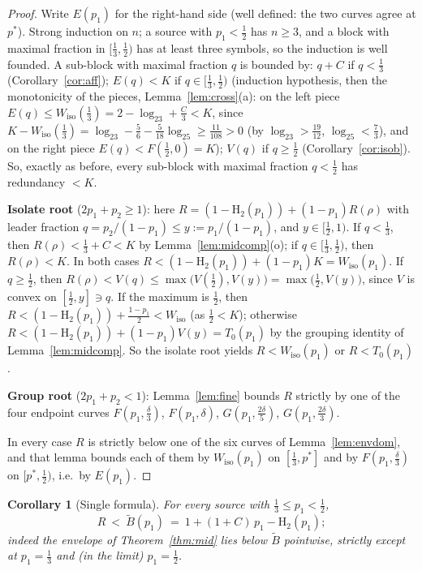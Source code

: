 \documentclass[journal]{IEEEtran}
\newtheorem{corollary}{Corollary}
\theoremstyle{definition}
\newcommand{\Hh}{\mathrm H_2}
\newcommand{\lgg}{\log_2}
\newcommand{\CC}{C}
\begin{document}
\begin{proof}
Write $E(p_1)$ for the right-hand side (well defined: the two curves agree at
$p^*$). Strong induction on $n$; a source with $p_1<\tfrac12$ has $n\ge3$,
and a block with maximal fraction in $[\tfrac13,\tfrac12)$ has at least three
symbols, so the induction is well founded. A sub-block with maximal fraction
$q$ is bounded by: $q+\CC$ if $q<\tfrac13$ (Corollary~\ref{cor:aff});
$E(q)<K$ if $q\in[\tfrac13,\tfrac12)$ (induction hypothesis, then the
monotonicity of the pieces, Lemma~\ref{lem:cross}(a): on the left piece
$E(q)\le W_{\mathrm{iso}}(\tfrac13)=2-\lgg3+\tfrac{\CC}3<K$, since
$K-W_{\mathrm{iso}}(\tfrac13)=\lgg3-\tfrac56-\tfrac5{18}\lgg5\ge\tfrac{11}{108}>0$
\textup{(}by $\lgg3>\tfrac{19}{12}$, $\lgg5<\tfrac73$\textup{)}, and on the right piece
$E(q)<F(\tfrac12,0)=K$); $V(q)$ if $q\ge\tfrac12$
(Corollary~\ref{cor:isob}). So, exactly as before, every sub-block with
maximal fraction $q<\tfrac12$ has redundancy $<K$.

\textbf{Isolate root} ($2p_1+p_2\ge1$): here $R=(1-\Hh(p_1))+(1-p_1)R(\rho)$
with leader fraction $q=p_2/(1-p_1)\le y:=p_1/(1-p_1)$, and
$y\in[\tfrac12,1)$. If $q<\tfrac13$, then $R(\rho)<\tfrac13+\CC<K$ by
Lemma~\ref{lem:midcomp}(o); if $q\in[\tfrac13,\tfrac12)$, then $R(\rho)<K$.
In both cases $R<(1-\Hh(p_1))+(1-p_1)K=W_{\mathrm{iso}}(p_1)$. If $q\ge\tfrac12$, then
$R(\rho)<V(q)\le\max\bigl(V(\tfrac12),V(y)\bigr)=\max\bigl(\tfrac12,V(y)\bigr)$,
since $V$ is convex on $[\tfrac12,y]\ni q$. If the maximum is $\tfrac12$,
then $R<(1-\Hh(p_1))+\tfrac{1-p_1}2<W_{\mathrm{iso}}$ (as $\tfrac12<K$);
otherwise $R<(1-\Hh(p_1))+(1-p_1)V(y)=T_0(p_1)$ by the grouping identity of
Lemma~\ref{lem:midcomp}. So the isolate root yields $R<W_{\mathrm{iso}}(p_1)$
or $R<T_0(p_1)$.

\textbf{Group root} ($2p_1+p_2<1$): Lemma~\ref{lem:fine} bounds $R$ strictly by
one of the four endpoint curves $F(p_1,\tfrac\delta3)$, $F(p_1,\delta)$,
$G(p_1,\tfrac{2\delta}5)$, $G(p_1,\tfrac{2\delta}3)$.

In every case $R$ is strictly below one of the six curves of
Lemma~\ref{lem:envdom}, and that lemma bounds each of them by
$W_{\mathrm{iso}}(p_1)$ on $[\tfrac13,p^*]$ and by $F(p_1,\tfrac\delta3)$ on
$[p^*,\tfrac12)$, i.e.\ by $E(p_1)$.
\end{proof}

\begin{corollary}[Single formula]\label{cor:bt}
For every source with $\tfrac13\le p_1<\tfrac12$,
\[
  R\ <\ \tilde B(p_1)\ =\ 1+(1+\CC)\,p_1-\Hh(p_1);
\]
indeed the envelope of Theorem~\ref{thm:mid} lies below $\tilde B$ pointwise,
strictly except at $p_1=\tfrac13$ and (in the limit) $p_1=\tfrac12$.
\end{corollary}
\end{document}
